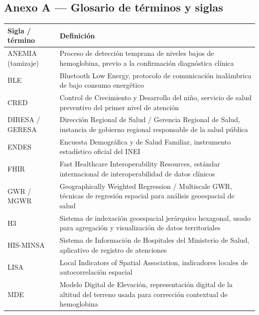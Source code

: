 \documentclass[11pt,a4paper]{article}
\begin{document}
\subsection{Anexo A --- Glosario de términos y siglas}\label{anexo-a-glosario-de-tuxe9rminos-y-siglas}

{\small
\begin{longtable}[]{@{}
  >{\raggedright\arraybackslash}p{}
  >{\raggedright\arraybackslash}p{}@{}}
\toprule\noalign{}
\begin{minipage}[b]{\linewidth}\raggedright
Sigla / término
\end{minipage} & \begin{minipage}[b]{\linewidth}\raggedright
Definición
\end{minipage} \\
\midrule\noalign{}
\endhead
\bottomrule\noalign{}
\endlastfoot
ANEMIA (tamizaje) & Proceso de detección temprana de niveles bajos de hemoglobina, previo a la confirmación diagnóstica clínica \\
BLE & Bluetooth Low Energy, protocolo de comunicación inalámbrica de bajo consumo energético \\
CRED & Control de Crecimiento y Desarrollo del niño, servicio de salud preventivo del primer nivel de atención \\
DIRESA / GERESA & Dirección Regional de Salud / Gerencia Regional de Salud, instancia de gobierno regional responsable de la salud pública \\
ENDES & Encuesta Demográfica y de Salud Familiar, instrumento estadístico oficial del INEI \\
FHIR & Fast Healthcare Interoperability Resources, estándar internacional de interoperabilidad de datos clínicos \\
GWR / MGWR & Geographically Weighted Regression / Multiscale GWR, técnicas de regresión espacial para análisis geoespacial de salud \\
H3 & Sistema de indexación geoespacial jerárquico hexagonal, usado para agregación y visualización de datos territoriales \\
HIS-MINSA & Sistema de Información de Hospitales del Ministerio de Salud, aplicativo de registro de atenciones \\
LISA & Local Indicators of Spatial Association, indicadores locales de autocorrelación espacial \\
MDE & Modelo Digital de Elevación, representación digital de la altitud del terreno usada para corrección contextual de hemoglobina \\

\end{longtable}}
\end{document}
